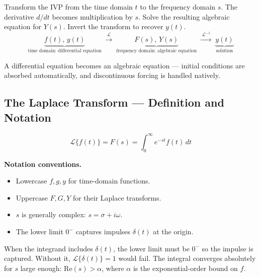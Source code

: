 \documentclass[11pt]{article}
\begin{document}
\begin{methodbox}
Transform the IVP from the time domain $t$ to the frequency domain $s$. The derivative $d/dt$ becomes multiplication by $s$. Solve the resulting algebraic equation for $Y(s)$. Invert the transform to recover $y(t)$.
\[
\underbrace{f(t),\,y(t)}_{\text{time domain: differential equation}}
\;\xrightarrow{\ \mathcal{L}\ }\;
\underbrace{F(s),\,Y(s)}_{\text{frequency domain: algebraic equation}}
\;\xrightarrow{\ \mathcal{L}^{-1}\ }\;
\underbrace{y(t)}_{\text{solution}}
\]
\end{methodbox}

\begin{conceptbox}
A \textcolor{accentorange}{differential equation becomes an algebraic equation} --- initial conditions are absorbed automatically, and \textcolor{accentorange}{discontinuous forcing is handled natively}.
\end{conceptbox}

\subsection{The Laplace Transform --- Definition and Notation}

\begin{formulabox}
\[
\mathcal{L}\{f(t)\} = F(s) = \int_0^{\infty} e^{-st} f(t)\, dt
\]
\end{formulabox}

\noindent\textbf{Notation conventions.}
\begin{itemize}[leftmargin=*, itemsep=1pt]
  \item Lowercase $f, g, y$ for time-domain functions.
  \item Uppercase $F, G, Y$ for their Laplace transforms.
  \item $s$ is generally complex: $s = \sigma + i\omega$.
  \item The lower limit $0^{-}$ captures impulses $\delta(t)$ at the origin.
\end{itemize}

\begin{warningbox}
When the integrand includes $\delta(t)$, the lower limit must be $0^{-}$ so the impulse is captured. Without it, $\mathcal{L}\{\delta(t)\} = 1$ would fail. The integral converges absolutely for $s$ large enough: $\mathrm{Re}(s) > \alpha$, where $\alpha$ is the exponential-order bound on $f$.
\end{warningbox}
\end{document}
